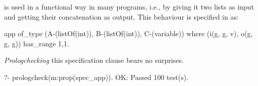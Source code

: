  is used in a functional way in many programs,
i.e., by giving it two lists as input and getting their concatenation as
output.
%
This behaviour is specified in \plqc{} as:
\begin{yapcode}
 app of_type (A-(listOf(int)), B-(listOf(int)), C-(variable))
   where (i(g, g, v), o(g, g, g))  has_range {1,1}.
\end{yapcode}
%
\emph{Prologchecking} this specification clause bears no surprises.
%
\begin{yapcode}
   ?- prologcheck(m:prop(spec_app)).
 OK: Passed 100 test(s).
\end{yapcode}


